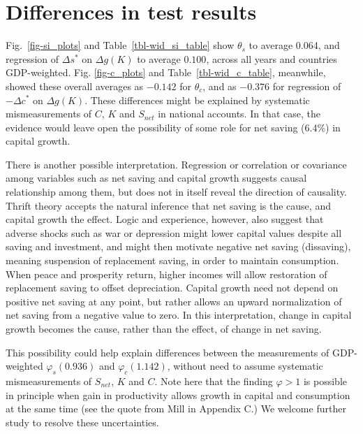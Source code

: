 \documentclass[a4paper,fleqn]{latex_styles/cas-sc}
\begin{document}


\section{Differences in test results\label{sec-difftest}}

Fig.~\ref{fig-si_plots} and Table~\ref{tbl-wid_si_table} show \(\theta_s\) to average 0.064, and regression of \(\Delta s^*\) on \(\Delta g(K)\) to average \(0.100\), across all years and countries GDP-weighted. Fig. \ref{fig-c_plots} and Table~\ref{tbl-wid_c_table}, meanwhile, showed these overall averages as \(-0.142\) for \(\theta_c\), and as \(-0.376\) for regression of \(-\Delta c^*\) on \(\Delta g (K)\). These differences might be explained by systematic mismeasurements of \(C\), \(K\) and \(S_{net}\) in national accounts. In that case, the evidence would leave open the possibility of some role for net saving (6.4\%) in capital growth.

There is another possible interpretation. Regression or correlation or covariance among variables such as net saving and capital growth suggests causal relationship among them, but does not in itself reveal the direction of causality. Thrift theory accepts the natural inference that net saving is the cause, and capital growth the effect. Logic and experience, however, also suggest that adverse shocks such as war or depression might lower capital values despite all saving and investment, and might then motivate negative net saving (dissaving), meaning suspension of replacement saving, in order to maintain consumption. When peace and prosperity return, higher incomes will allow restoration of replacement saving to offset depreciation. Capital growth need not depend on positive net saving at any point, but rather allows an upward normalization of net saving from a negative value to zero. In this interpretation, change in capital growth becomes the cause, rather than the effect, of change in net saving.

\FloatBarrier

\FloatBarrier

This possibility could help explain differences between the measurements of GDP-weighted \(\varphi_s (0.936)\) and \(\varphi_c (1.142)\), without need to assume systematic mismeasurements of \(S_{net}\), \(K\) and \(C\). Note here that the finding \(\varphi > 1\) is possible in principle when gain in productivity allows growth in capital and consumption at the same time (see the quote from Mill in Appendix C.) We welcome further study to resolve these uncertainties.
\end{document}

